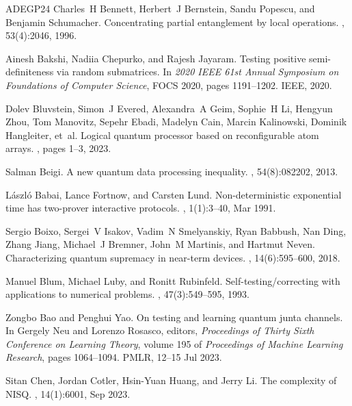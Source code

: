 \documentclass[10pt,a4paper]{article}
\theoremstyle{plain}
\theoremstyle{definition}
\newcommand{\1}{\mathbb{1}} %
\begin{document}
\begin{thebibliography}{ADEGP24}
Charles~H Bennett, Herbert~J Bernstein, Sandu Popescu, and Benjamin Schumacher.
\newblock Concentrating partial entanglement by local operations.
, 53(4):2046, 1996.

Ainesh Bakshi, Nadiia Chepurko, and Rajesh Jayaram.
\newblock Testing positive semi-definiteness via random submatrices.
\newblock In {\em 2020 IEEE 61st Annual Symposium on Foundations of Computer
  Science}, FOCS 2020, pages 1191--1202. IEEE, 2020.

Dolev Bluvstein, Simon~J Evered, Alexandra~A Geim, Sophie~H Li, Hengyun Zhou,
  Tom Manovitz, Sepehr Ebadi, Madelyn Cain, Marcin Kalinowski, Dominik
  Hangleiter, et~al.
\newblock Logical quantum processor based on reconfigurable atom arrays.
, pages 1--3, 2023.

Salman Beigi.
\newblock A new quantum data processing inequality.
, 54(8):082202, 2013.

L{\'a}szl{\'o} Babai, Lance Fortnow, and Carsten Lund.
\newblock Non-deterministic exponential time has two-prover interactive
  protocols.
, 1(1):3--40, Mar 1991.

Sergio Boixo, Sergei~V Isakov, Vadim~N Smelyanskiy, Ryan Babbush, Nan Ding,
  Zhang Jiang, Michael~J Bremner, John~M Martinis, and Hartmut Neven.
\newblock Characterizing quantum supremacy in near-term devices.
, 14(6):595--600, 2018.

Manuel Blum, Michael Luby, and Ronitt Rubinfeld.
\newblock Self-testing/correcting with applications to numerical problems.
, 47(3):549--595, 1993.

Zongbo Bao and Penghui Yao.
\newblock On testing and learning quantum junta channels.
\newblock In Gergely Neu and Lorenzo Rosasco, editors, {\em Proceedings of
  Thirty Sixth Conference on Learning Theory}, volume 195 of {\em Proceedings
  of Machine Learning Research}, pages 1064--1094. PMLR, 12--15 Jul 2023.

Sitan Chen, Jordan Cotler, Hsin-Yuan Huang, and Jerry Li.
\newblock The complexity of {NISQ}.
, 14(1):6001, Sep 2023.


\end{thebibliography}
\end{document}

